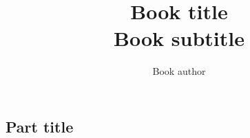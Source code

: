 \documentclass[oneside]{book} %
\newcommand{\bookTitle}{Book title} %
\newcommand{\bookSubtitle}{Book subtitle} %
\newcommand{\bookAuthor}{Book author} %
\begin{document}
    \begin{spacing}{1.5} %
        
        
        \frontmatter
        
        \title{\Huge{\textbf{\bookTitle}} \\ \LARGE{\bookSubtitle}} %
        \author{\bookAuthor} %
        \date{} %

        \maketitle %

        
        \setcounter{tocdepth}{1} %
        \tableofcontents %


        \mainmatter
        
        \part{Part title}
            
            
        
        \backmatter
        
    \end{spacing}
\end{document}
